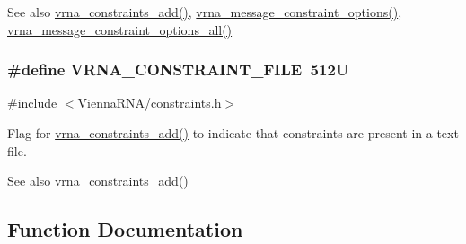 \begin{DoxySeeAlso}{See also}
\hyperlink{group__constraints_ga35a401f680969a556858a8dd5f1d07cc}{vrna\+\_\+constraints\+\_\+add()}, \hyperlink{group__constraints_gaa1f20b53bf09ac2e6b0dbb13f7d89670}{vrna\+\_\+message\+\_\+constraint\+\_\+options()}, \hyperlink{group__constraints_gaec7e13fa0465c2acc7a621d1aecb709f}{vrna\+\_\+message\+\_\+constraint\+\_\+options\+\_\+all()} 
\end{DoxySeeAlso}
\hypertarget{group__constraints_ga62e0ed0c33002c09423de4e646f85a2b}{}
\subsubsection[{V\+R\+N\+A\+\_\+\+C\+O\+N\+S\+T\+R\+A\+I\+N\+T\+\_\+\+F\+I\+L\+E}]{\setlength{\rightskip}{0pt plus 5cm}\#define V\+R\+N\+A\+\_\+\+C\+O\+N\+S\+T\+R\+A\+I\+N\+T\+\_\+\+F\+I\+L\+E~512\+U}\label{group__constraints_ga62e0ed0c33002c09423de4e646f85a2b}


{\ttfamily \#include $<$\hyperlink{constraints_8h}{Vienna\+R\+N\+A/constraints.\+h}$>$}



Flag for \hyperlink{group__constraints_ga35a401f680969a556858a8dd5f1d07cc}{vrna\+\_\+constraints\+\_\+add()} to indicate that constraints are present in a text file. 

\begin{DoxySeeAlso}{See also}
\hyperlink{group__constraints_ga35a401f680969a556858a8dd5f1d07cc}{vrna\+\_\+constraints\+\_\+add()} 
\end{DoxySeeAlso}


\subsection{Function Documentation}
\hypertarget{group__constraints_gaa1f20b53bf09ac2e6b0dbb13f7d89670}{}

